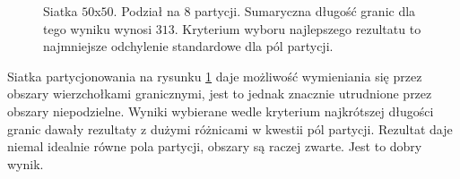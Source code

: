 \begin{figure}[h]
\begin{subfigure}{.33\textwidth}
    \caption[short]{}
\end{subfigure}
\caption{Siatka $50$x$50$. Podział na $8$ partycji. Sumaryczna długość granic dla tego wyniku wynosi $313$.
Kryterium wyboru najlepszego rezultatu to najmniejsze odchylenie standardowe dla pól partycji.}
\label{result:3}
\end{figure}

Siatka partycjonowania na rysunku \ref{result:3} daje możliwość wymieniania się przez obszary wierzchołkami granicznymi,
jest to jednak znacznie utrudnione przez obszary niepodzielne.
Wyniki wybierane wedle kryterium najkrótszej długości granic dawały rezultaty z dużymi różnicami w kwestii pól partycji.
Rezultat daje niemal idealnie równe pola partycji, obszary są raczej zwarte.
Jest to dobry wynik.

\begin{figure}[h]
\centering
\begin{subfigure}{.33\textwidth}
    \centering
    \caption[short]{}
\end{subfigure}%
\begin{subfigure}{.33\textwidth}
    \centering

\end{subfigure}
\end{figure}
